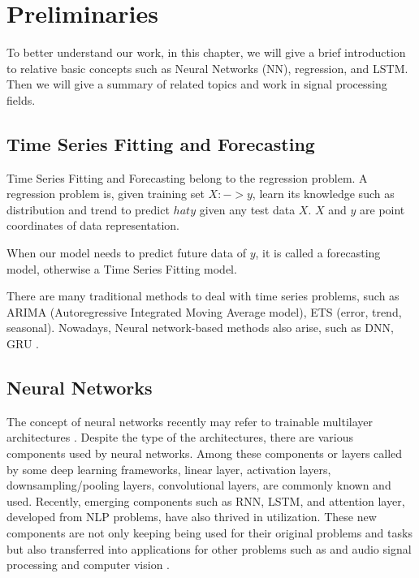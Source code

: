 \chapter{Preliminaries}\label{sec-preliminaries}

To better understand our work, in this chapter, we will give a brief introduction to relative basic concepts such as Neural Networks (NN), regression, and LSTM. Then we will give a summary of related topics and work in signal processing fields.

\section{Time Series Fitting and Forecasting}


Time Series Fitting and Forecasting belong to the regression problem. A regression problem is, given training set $X:->y$, learn its knowledge such as distribution and trend to predict $hat y$ given any test data $X$. $X$ and $y$ are point coordinates of data representation.

When our model needs to predict future data of $y$, it is called a forecasting model, otherwise a Time Series Fitting model.

There are many traditional methods to deal with time series problems, such as ARIMA (Autoregressive Integrated Moving Average model), ETS (error, trend, seasonal). Nowadays, Neural network-based methods also arise, such as DNN, GRU \cite{lim2021temporal}.

\section{Neural Networks}

The concept of neural networks recently may refer to trainable multilayer architectures \cite{hinton2015deep}. Despite the type of the architectures, there are various components used by neural networks. Among these components or layers called by some deep learning frameworks, linear layer, activation layers, downsampling/pooling layers, convolutional layers, are commonly known and used. Recently, emerging components such as RNN, LSTM, and attention layer, developed from NLP problems, have also thrived in utilization. These new components are not only keeping being used for their original problems and tasks but also transferred into applications for other problems such as and audio signal processing \cite{oord2016wavenet} and computer vision \cite{vaswani2017attention}.

